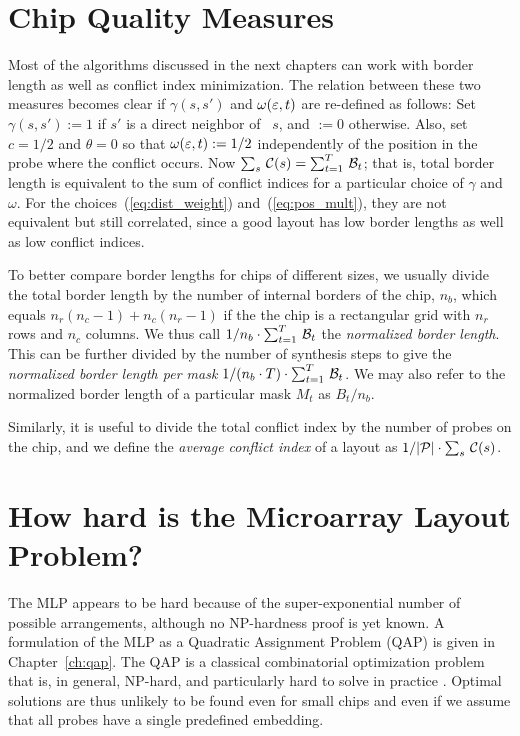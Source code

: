 \section{Chip Quality Measures}
\label{sec:mlp_bl_vs_ci}

Most of the algorithms discussed in the next chapters can work with border
length as well as conflict index minimization. The relation between these two
measures becomes clear if $\gamma(s,s')$ and $\omega(\varepsilon,t)$ are re-defined as
follows: Set $\gamma(s,s') := 1$ if $s'$ is a direct neighbor of~ $s$, and $:=0$
otherwise. Also, set $c=1/2$ and $\theta=0$ so that $\omega(\varepsilon,t) := 1/2$
independently of the position in the probe where the conflict occurs. Now
$\sum_s\, {\mathcal{C}}(s) = \sum_{t=1}^T\, {\mathcal{B}}_t$; that is, total border length is
equivalent to the sum of conflict indices for a particular choice of $\gamma$
and $\omega$. For the choices~(\ref{eq:dist_weight}) and~(\ref{eq:pos_mult}),
they are not equivalent but still correlated, since a good layout has low border
lengths as well as low conflict indices.

To better compare border lengths for chips of different sizes, we usually divide
the total border length by the number of internal borders of the chip, $n_b$,
which equals $n_r(n_c - 1) + n_c(n_r - 1)$ if the the chip is a rectangular grid
with $n_r$ rows and $n_c$ columns. We thus call
$1/n_b \cdot \sum_{t=1}^T\, {\mathcal{B}}_t$ the \emph{normalized border length}. This
can be further divided by the number of synthesis steps to give the \emph{
normalized border length per mask}
$1/(n_b \cdot T) \cdot \sum_{t=1}^T\, {\mathcal{B}}_t$. We may also refer to the
normalized border length of a particular mask $M_t$ as $B_t/n_b$.

Similarly, it is useful to divide the total conflict index by the number of
probes on the chip, and we define the \emph{average conflict index} of a layout
as $1/|{\mathcal{P}}| \cdot \sum_s\, {\mathcal{C}}(s)$.

\section{How hard is the Microarray Layout Problem?}
\label{sec:mlp_how_hard}

The MLP appears to be hard because of the super-exponential number of possible
arrangements, although no NP-hardness proof is yet known. A formulation of the
MLP as a Quadratic Assignment Problem (QAP) is given in Chapter~\ref{ch:qap}.
The QAP is a classical combinatorial optimization problem that is, in general,
NP-hard, and particularly hard to solve in practice \citep{Cela1997}. Optimal
solutions are thus unlikely to be found even for small chips and even if we
assume that all probes have a single predefined embedding.


